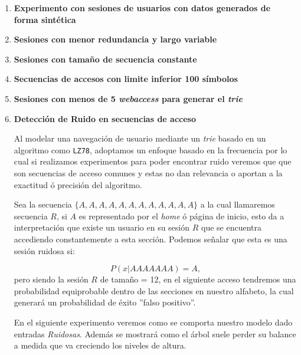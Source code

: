 \vspace{1cm}
\begin{enumerate}
	\item\label{exp1} \textbf{Experimento con sesiones de usuarios con datos generados de forma sintética}
	
	
	
	\newpage
	\item \label{exp2} \textbf{Sesiones con menor redundancia y  largo variable }
	


	\item \label{exp3}	
	\textbf{Sesiones con tamaño de secuencia constante}
	
	

	\item \label{exp4} \textbf{Secuencias de accesos con limite inferior 100 símbolos }
	


	\item \label{exp5}	
	\textbf{Sesiones con menos de 5 \emph{webaccess} para generar el \emph{trie}}
		
	
	
	\item \label{exp6} 
	\textbf{Detección de Ruido en secuencias de acceso}
	
	Al modelar una navegación de usuario mediante un \emph{trie} basado en un algoritmo como \texttt{LZ78}, adoptamos un enfoque basado en la frecuencia por lo cual si realizamos experimentos para poder encontrar ruido veremos que que son secuencias de acceso comunes y estas no dan relevancia o aportan a la exactitud ó precisión del algoritmo.
	
	Sea la secuencia $\{A,A,A,A,A,A,A,A,A,A,A,A \}$ a la cual llamaremos secuencia $R$, si $A$ es representado por el \emph{home} ó página de inicio, esto da a interpretación que existe un usuario en su sesión $R$ que se encuentra accediendo constantemente a esta sección. Podemos señalar que esta es una sesión ruidosa si:
	
	\begin{equation}
		P( x | AAAAAAA)= A ,	
	\end{equation} pero siendo la sesión $R$ de tamaño = 12, en el siguiente acceso tendremos una probabilidad equiprobable dentro de las secciones en nuestro alfabeto, la cual generará un probabilidad de éxito ''falso positivo''.
	
	En el siguiente experimento veremos como se comporta nuestro modelo dado entradas \emph{Ruidosas}. Además se mostrará como el árbol suele perder su balance a medida que va creciendo los niveles de altura. 
	

\end{enumerate}
